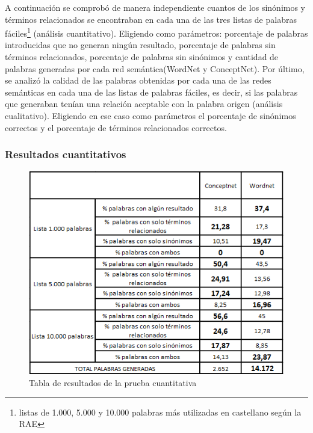 A continuación se comprobó de manera independiente cuantos de los sinónimos y términos relacionados se encontraban en cada una de las tres listas de palabras fáciles\footnote{listas de 1.000, 5.000 y 10.000 palabras más utilizadas en castellano según la RAE} (análisis cuantitativo). Eligiendo como parámetros: porcentaje de palabras introducidas que no generan ningún resultado, porcentaje de palabras sin términos relacionados, porcentaje de palabras sin sinónimos  y cantidad de palabras generadas por cada red semántica(WordNet y ConceptNet). Por último, se analizó la calidad de las palabras obtenidas por cada una de las redes semánticas en cada una de las listas de palabras fáciles, es decir, si las palabras que generaban tenían una relación aceptable con la palabra origen (análisis cualitativo). Eligiendo en ese caso como parámetros el porcentaje de sinónimos correctos y el porcentaje de términos relacionados correctos.

\subsubsection{Resultados cuantitativos}
\label{cap:sec:pruebaCuantitativa}
\begin{figure}[!h]
\includegraphics[width=1.0\textwidth]{Imagenes/Bitmap/Capitulo4/tabla_cuantitativa}
\caption{Tabla de resultados de la prueba cuantitativa}
\label{fig:tabla_cuantitativa}
\end{figure}

